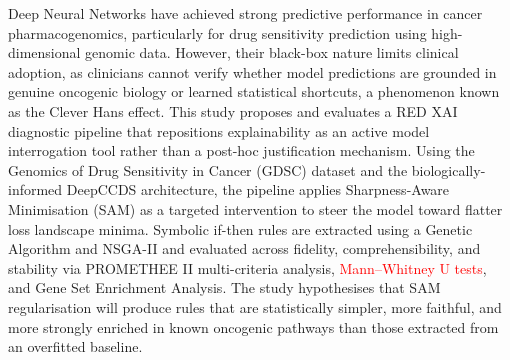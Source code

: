 
Deep Neural Networks have achieved strong predictive performance in cancer pharmacogenomics,
particularly for drug sensitivity prediction using high-dimensional genomic data. However, their
black-box nature limits clinical adoption, as clinicians cannot verify whether model predictions are
grounded in genuine oncogenic biology or learned statistical shortcuts, a phenomenon known as
the Clever Hans effect. This study proposes and evaluates a RED XAI diagnostic pipeline that
repositions explainability as an active model interrogation tool rather than a post-hoc justification
mechanism. Using the Genomics of Drug Sensitivity in Cancer (GDSC) dataset and the
biologically-informed DeepCCDS architecture, the pipeline applies Sharpness-Aware Minimisation
(SAM) as a targeted intervention to steer the model toward flatter loss landscape minima. Symbolic
if-then rules are extracted using a Genetic Algorithm and NSGA-II and evaluated across fidelity,
comprehensibility, and stability via PROMETHEE II multi-criteria analysis, \textcolor{red}{Mann--Whitney U tests}, and Gene Set
Enrichment Analysis. The study hypothesises that SAM regularisation will
produce rules that are statistically simpler, more faithful, and more strongly enriched in known
oncogenic pathways than those extracted from an overfitted baseline.

